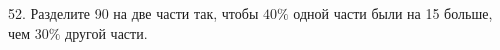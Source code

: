 52. Разделите 90 на две части так, чтобы $40\%$ одной части были на 15 больше, чем $30\%$ другой части.\\

